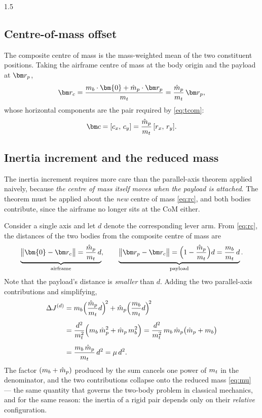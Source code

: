 \begin{spacing}{1.5}
\subsection{Centre-of-mass offset}\label{sec:model:com}

The composite centre of mass is the mass-weighted mean of the two
constituent positions. Taking the airframe centre of mass at the body
origin and the payload at $\rp$,
\begin{equation}
\rc = \frac{\mb \cdot \bm{0} + \mpay \cdot \rp}{\mt}
= \frac{\mpay}{\mt}\, \rp ,
\label{eq:rc}
\end{equation}
whose horizontal components are the pair required by \eqref{eq:tcom}:
\begin{equation}
\cvec = [c_x,\, c_y] = \frac{\mpay}{\mt}\, [r_x,\, r_y].
\label{eq:cxy}
\end{equation}

\subsection{Inertia increment and the reduced mass}\label{sec:model:paxis}

The inertia increment requires more care than the parallel-axis theorem
applied naively, because \emph{the centre of mass itself moves when the
payload is attached}. The theorem must be applied about the \emph{new}
centre of mass \eqref{eq:rc}, and both bodies contribute, since the
airframe no longer sits at the CoM either.

Consider a single axis and let $d$ denote the corresponding lever arm.
From \eqref{eq:rc}, the distances of the two bodies from the composite
centre of mass are
\begin{equation}
\underbrace{\bigl\| \bm{0} - \rc \bigr\| = \frac{\mpay}{\mt}\, d}_{\text{airframe}},
\qquad
\underbrace{\bigl\| \rp - \rc \bigr\| = \Bigl( 1 - \frac{\mpay}{\mt} \Bigr) d = \frac{\mb}{\mt}\, d}_{\text{payload}} .
\label{eq:dists}
\end{equation}
Note that the payload's distance is \emph{smaller} than $d$. Adding the
two parallel-axis contributions and simplifying,
\begin{align}
\Delta J^{(d)}
&= m_b \Bigl( \frac{\hat{m}_p}{m_t} d \Bigr)^{\!2}
 + \hat{m}_p \Bigl( \frac{m_b}{m_t} d \Bigr)^{\!2} \nonumber \\[4pt]
&= \frac{d^2}{m_t^2}\Bigl( m_b\, \hat{m}_p^2 + \hat{m}_p\, m_b^2 \Bigr)
 = \frac{d^2}{m_t^2}\, m_b\, \hat{m}_p \bigl( \hat{m}_p + m_b \bigr) \nonumber \\[4pt]
&= \frac{m_b\, \hat{m}_p}{m_t}\, d^2
 = \mu\, d^2 .
\label{eq:reduced}
\end{align}
The factor $(m_b + \hat{m}_p)$ produced by the sum cancels one power of $m_t$
in the denominator, and the two contributions collapse onto the reduced
mass \eqref{eq:mu} --- the same quantity that governs the two-body
problem in classical mechanics, and for the same reason: the inertia of a
rigid pair depends only on their \emph{relative} configuration.


\end{spacing}
